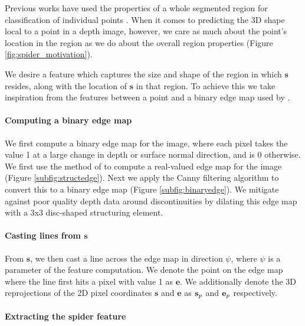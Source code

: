 \documentclass[10pt,twocolumn,letterpaper]{article}
\newcommand{\pixelidx}{\mathbf{s}}
\newcommand{\edgeimidx}{\mathbf{e}}
\newcommand{\point}{\mathbf{p}}
\begin{document}
Previous works have used the properties of a whole segmented region for classification of individual points \cite{golovinskiy-iccv-2009}.
When it comes to predicting the 3D shape local to a point in a depth image, however, we care as much about the point's location in the region as we do about the overall region properties (Figure \ref{fig:spider_motivation}).

We desire a feature which captures the size and shape of the region in which $\pixelidx$ resides, along with the location of $\pixelidx$ in that region.
To achieve this we take inspiration from the features between a point and a binary edge map used by \cite{drost-3dimpvt-2012}.

\paragraph{Computing a binary edge map}
We first compute a binary edge map for the image, where each pixel takes the value 1 at a large change in depth or surface normal direction, and is 0 otherwise.
We first use the method of \cite{dollar-iccv-2013} to compute a real-valued edge map for the image (Figure \ref{subfig:structedge}).
Next we apply the Canny filtering algorithm \cite{canny-pami-1986} to convert this to a binary edge map (Figure \ref{subfig:binaryedge}).
We mitigate against poor quality depth data around discontinuities by dilating this edge map with a 3x3 disc-shaped structuring element.



\paragraph{Casting lines from $\pixelidx$}
From $\pixelidx$, we then cast a line across the edge map in direction $\psi$, where $\psi$ is a parameter of the feature computation.
We denote the point on the edge map where the line first hits a pixel with value 1 as $\edgeimidx$.
We additionally denote the 3D reprojections of the 2D pixel coordinates $\pixelidx$ and $\edgeimidx$ as $\pointthreed$ and $\edgethreed$ respectively.

\paragraph{Extracting the spider feature}
\end{document}
